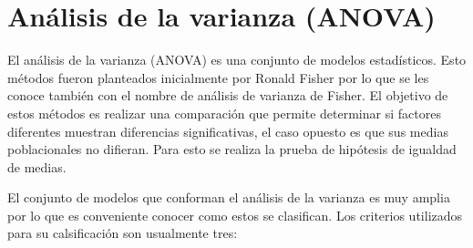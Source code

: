 \section{Análisis de la varianza (ANOVA)}
\label{preliminares:anova}

El análisis de la varianza (ANOVA) es una conjunto de modelos estadísticos. Esto métodos fueron planteados inicialmente por Ronald Fisher por lo que se les conoce también con el nombre de análisis de varianza de Fisher. El objetivo de estos métodos es realizar una comparación que permite determinar si factores diferentes muestran diferencias significativas, el caso opuesto es que sus medias poblacionales no difieran. Para esto se realiza la prueba de hipótesis de igualdad de medias. 

El conjunto de modelos que conforman el análisis de la varianza es muy amplia por lo que es conveniente conocer como estos se clasifican. Los criterios utilizados para su calsificación son usualmente tres: 

